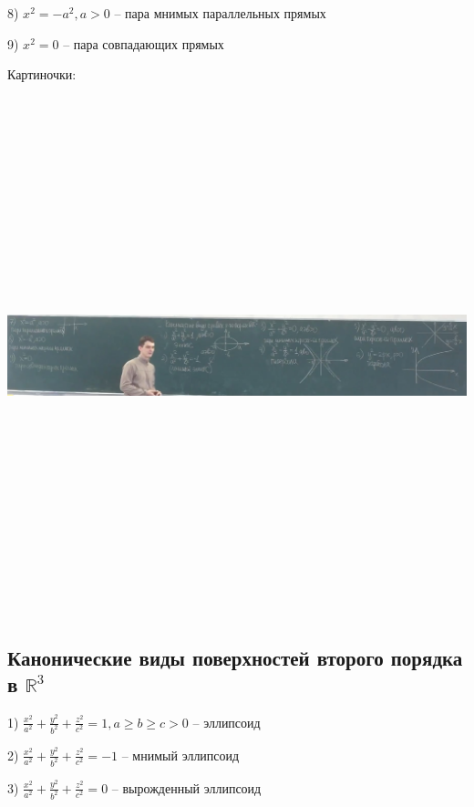 \vspace{\baselineskip}
8) $x^2 = -a^2, a > 0$ -- пара мнимых параллельных прямых

\vspace{\baselineskip}
9) $x^2 = 0$ -- пара совпадающих прямых

\vspace{\baselineskip}
Картиночки:

\includegraphics[width=19cm,height=15cm,keepaspectratio]{example2.jpg}

\subsection{Канонические виды поверхностей второго порядка в $\mathbb{R}^3$}

1) $\frac{x^2}{a^2} + \frac{y^2}{b^2} + \frac{z^2}{c^2} = 1, a \geqslant b \geqslant c > 0$ -- эллипсоид

\vspace{\baselineskip}
2) $\frac{x^2}{a^2} + \frac{y^2}{b^2} + \frac{z^2}{c^2} = -1$ -- мнимый эллипсоид

\vspace{\baselineskip}
3) $\frac{x^2}{a^2} + \frac{y^2}{b^2} + \frac{z^2}{c^2} = 0$ -- вырожденный эллипсоид

